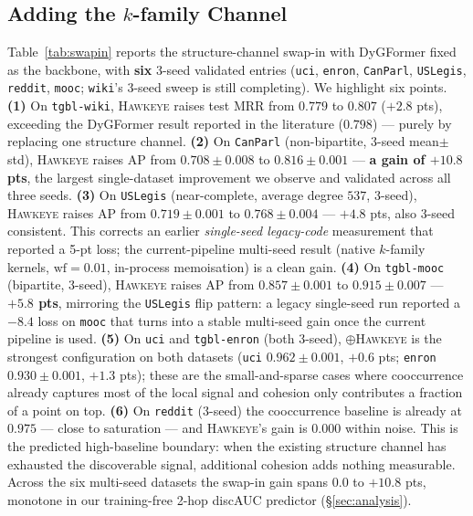 \documentclass[sigconf,nonacm,review]{acmart}
\newcommand{\method}{\textsc{Hawkeye}\xspace}
\begin{document}
\subsection{Adding the $k$-family Channel}
Table~\ref{tab:swapin} reports the structure-channel swap-in with DyGFormer
fixed as the backbone, with \textbf{six} 3-seed validated entries
(\texttt{uci}, \texttt{enron}, \texttt{CanParl}, \texttt{USLegis},
\texttt{reddit}, \texttt{mooc}; \texttt{wiki}'s 3-seed sweep is still
completing). We highlight six points.
\textbf{(1)} On \texttt{tgbl-wiki}, \method raises test MRR from
$0.779$ to $0.807$ ($+2.8$ pts), exceeding the DyGFormer result reported
in the literature ($0.798$) --- purely by replacing one structure
channel.
\textbf{(2)} On \texttt{CanParl} (non-bipartite, 3-seed mean$\pm$std),
\method raises AP from
$0.708\!\pm\!0.008$ to $\mathbf{0.816\!\pm\!0.001}$ ---
\textbf{a gain of $+10.8$ pts}, the largest single-dataset improvement we
observe and validated across all three seeds.
\textbf{(3)} On \texttt{USLegis}
(near-complete, average degree $537$, 3-seed), \method raises AP from
$0.719\!\pm\!0.001$ to $\mathbf{0.768\!\pm\!0.004}$ ---
$+4.8$ pts, also 3-seed consistent. This corrects an earlier
\emph{single-seed legacy-code} measurement that reported a 5-pt loss;
the current-pipeline multi-seed result (native $k$-family kernels,
$\mathrm{wf}=0.01$, in-process memoisation) is a clean gain.
\textbf{(4)} On \texttt{tgbl-mooc} (bipartite, 3-seed), \method raises
AP from $0.857\!\pm\!0.001$ to $\mathbf{0.915\!\pm\!0.007}$ ---
\textbf{$+5.8$ pts}, mirroring the \texttt{USLegis} flip pattern: a
legacy single-seed run reported a $-8.4$ loss on \texttt{mooc} that
turns into a stable multi-seed gain once the current pipeline is used.
\textbf{(5)} On \texttt{uci} and \texttt{tgbl-enron} (both 3-seed),
$\oplus$\method is the strongest configuration on both datasets
(\texttt{uci} $0.962\!\pm\!0.001$, $+0.6$ pts; \texttt{enron}
$0.930\!\pm\!0.001$, $+1.3$ pts); these are the small-and-sparse cases
where cooccurrence already captures most of the local signal and
cohesion only contributes a fraction of a point on top.
\textbf{(6)} On \texttt{reddit} (3-seed) the cooccurrence baseline is
already at $0.975$ --- close to saturation --- and \method's gain is
$0.000$ within noise. This is the predicted high-baseline boundary:
when the existing structure channel has exhausted the discoverable
signal, additional cohesion adds nothing measurable.
Across the six multi-seed datasets the swap-in gain spans $0.0$ to
$+10.8$ pts, monotone in our training-free 2-hop discAUC predictor
(\S\ref{sec:analysis}).
\end{document}
